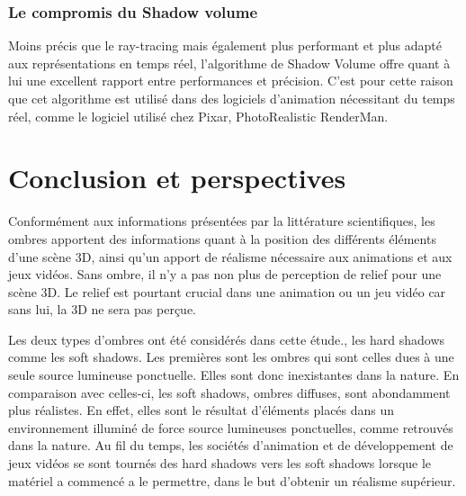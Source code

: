 \documentclass[a4paper,10pt]{report}
\begin{document}
\subsection{Le compromis du Shadow volume}

Moins précis que le ray-tracing mais également plus performant et plus adapté aux représentations en temps réel, l'algorithme de Shadow Volume offre quant à lui une excellent rapport entre performances et précision. C'est pour cette raison que cet algorithme est utilisé dans des logiciels d'animation nécessitant du temps réel, comme le logiciel utilisé chez Pixar, PhotoRealistic RenderMan.


\chapter{Conclusion et perspectives}

Conformément aux informations présentées par la littérature scientifiques, les ombres apportent des informations quant à la position des différents éléments d'une scène 3D, ainsi qu'un apport de réalisme nécessaire aux animations et aux jeux vidéos. Sans ombre, il n'y a pas non plus de perception de relief pour une scène 3D. Le relief est pourtant crucial dans une animation ou un jeu vidéo car sans lui, la 3D ne sera pas perçue. 

Les deux types d'ombres ont été considérés dans cette étude., les hard shadows comme les soft shadows. Les premières sont les ombres qui sont celles dues à une seule source lumineuse ponctuelle. Elles sont donc inexistantes dans la nature. En comparaison avec celles-ci, les soft shadows, ombres diffuses, sont abondamment plus réalistes. En effet, elles sont le résultat d'éléments placés dans un environnement illuminé de force source lumineuses ponctuelles, comme retrouvés dans la nature.
Au fil du temps, les sociétés d'animation et de développement de jeux vidéos se sont tournés des hard shadows vers les soft shadows lorsque le matériel a commencé a le permettre, dans le but d'obtenir un réalisme supérieur.
\end{document}
